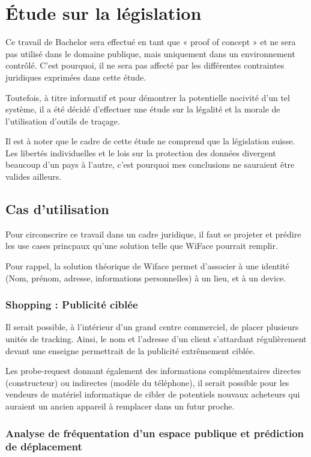 \chapter{Étude sur la législation}
\label{ch:etudelegislation}

Ce travail de Bachelor sera effectué en tant que « proof of concept » et ne sera pas utilisé dans le domaine publique,
mais uniquement dans un environnement contrôlé. C’est pourquoi, il ne sera pas affecté par les différentes
contraintes juridiques exprimées dans cette étude.

Toutefois, à titre informatif et pour démontrer la potentielle nocivité d’un tel système, il a été décidé d’effectuer
une étude sur la légalité et la morale de l’utilisation d’outils de traçage.

Il est à noter que le cadre de cette étude ne comprend que la législation suisse. Les libertés individuelles et le lois sur la protection des données divergent beaucoup
d'un pays à l'autre, c'est pourquoi mes conclusions ne sauraient être valides ailleurs. 

\section{Cas d’utilisation}
Pour circonscrire ce travail dans un cadre juridique, il faut se projeter et prédire les use cases princpaux qu’une
solution telle que WiFace pourrait remplir.

Pour rappel, la solution théorique de Wiface permet d’associer à une identité (Nom, prénom, adresse, informations
personnelles) à un lieu, et à un device.

\subsection{Shopping : Publicité ciblée}

Il serait possible, à l’intérieur d’un grand centre commerciel, de placer plusieurs unités de tracking. Ainsi, le nom et
l’adresse d’un client s’attardant régulièrement devant une enseigne permettrait de la publicité extrêmement ciblée.

Les probe-request donnant également des informations complémentaires directes (constructeur) ou indirectes
(modèle du téléphone), il serait possible pour les vendeurs de matériel informatique de cibler de potentiels nouvaux
acheteurs qui auraient un ancien appareil à remplacer dans un futur proche.

\subsection{Analyse de fréquentation d’un espace publique et prédiction de déplacement}

